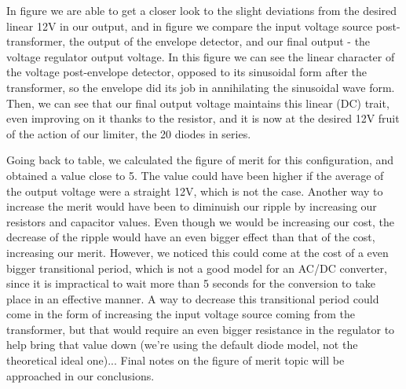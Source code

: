 In figure we are able to get a closer look to the slight deviations from the desired linear 12V in our output, and in figure we compare the input voltage source post-transformer, the output of the envelope detector, and our final output - the voltage regulator output voltage. In this figure we can see the linear character of the voltage post-envelope detector, opposed to its sinusoidal form after the transformer, so the envelope did its job in annihilating the sinusoidal wave form. Then, we can see that our final output voltage maintains this linear (DC) trait, even improving on it thanks to the resistor, and it is now at the desired 12V fruit of the action of our limiter, the 20 diodes in series.

Going back to table, we calculated the figure of merit for this configuration, and obtained a value close to 5. The value could have been higher if the average of the output voltage were a straight 12V, which is not the case. Another way to increase the merit would have been to diminuish our ripple by increasing our resistors and capacitor values. Even though we would be increasing our cost, the decrease of the ripple would have an even bigger effect than that of the cost, increasing our merit. However, we noticed this could come at the cost of a even bigger transitional period, which is not a good model for an AC/DC converter, since it is impractical to wait more than 5 seconds for the conversion to take place in an effective manner. A way to decrease this transitional period could come in the form of increasing the input voltage source coming from the transformer, but that would require an even bigger resistance in the regulator to help bring that value down (we're using the default diode model, not the theoretical ideal one)... Final notes on the figure of merit topic will be approached in our conclusions.

\par
